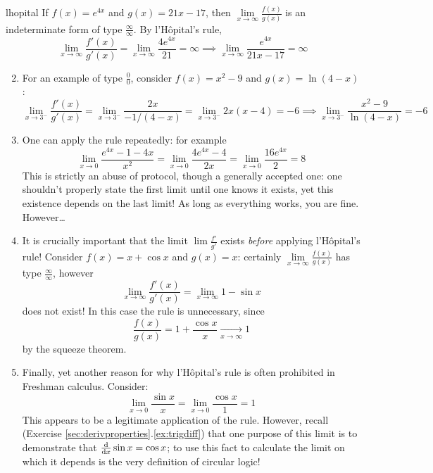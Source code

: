 \begin{examples}{}{lhopital}
	\exstart If $f(x)=e^{4x}$ and $g(x)=21x-17$, then $\lim\limits_{x\to\infty}\frac{f(x)}{g(x)}$ is an indeterminate form of type $\frac\infty\infty$. By l'Hôpital's rule,
	\[
	 	\lim_{x\to\infty}\frac{f'(x)}{g'(x)}
	 	=\lim_{x\to\infty}\frac{4e^{4x}}{21}=\infty
	 	\implies \lim_{x\to\infty}\frac{e^{4x}}{21x-17}=\infty
	\]
	
	\begin{enumerate}\setcounter{enumi}{1}
	  \item For an example of type $\frac 00$, consider $f(x)=x^2-9$ and $g(x)=\ln(4-x)$:
	  \[
		  \lim_{x\to 3^-}\frac{f'(x)}{g'(x)} 
		  =\lim_{x\to 3^-}\frac{2x}{-1/(4-x)} 
		  =\lim_{x\to 3^-}2x(x-4)=-6
		  \implies \lim_{x\to 3^-}\frac{x^2-9}{\ln(4-x)}=-6
	  \]
	  
	  \item One can apply the rule repeatedly: for example
	  \[
	  	\lim_{x\to 0}\frac{e^{4x}-1-4x}{x^2}
	  	=\lim_{x\to 0}\frac{4e^{4x}-4}{2x} 
	  	=\lim_{x\to 0}\frac{16e^{4x}}{2}=8
	  \]
	  This is strictly an abuse of protocol, though a generally accepted one: one shouldn't properly state the first limit until one knows it exists, yet this existence depends on the last limit! As long as everything works, you are fine. However\ldots
	  
	  \item\label{ex:lhopitalproblem1} It is crucially important that the limit $\lim\frac{f'}{g'}$ exists \emph{before} applying l'Hôpital's rule! Consider $f(x)=x+\cos x$ and $g(x)=x$: certainly $\lim\limits_{x\to\infty}\frac{f(x)}{g(x)}$ has type $\frac\infty\infty$, however
	  \[
	  	\lim\limits_{x\to\infty}\frac{f'(x)}{g'(x)}
	  	=\lim\limits_{x\to\infty}1-\sin x
	  \]
	  does not exist! In this case the rule is unnecessary, since
	  \[
	  	\frac{f(x)}{g(x)}
	  	=1+\frac{\cos x}x\xrightarrow[x\to\infty]{} 1
	  \]
	  by the squeeze theorem.
	  
	 	\item Finally, yet another reason for why l'Hôpital's rule is often prohibited in Freshman calculus. Consider:
	 	\[
	 		\lim_{x\to 0}\frac{\sin x}x
	 		=\lim_{x\to 0}\frac{\cos x}{1}=1
	 	\]
	 	This appears to be a legitimate application of the rule. However, recall (Exercise \ref*{sec:derivproperties}.\ref{ex:trigdiff}) that one purpose of this limit is to demonstrate that $\frac{\mathrm{d} }{\mathrm{d} x}\sin x=\cos x$; to use this fact to calculate the limit on which it depends is the very definition of circular logic!
	\end{enumerate}
\end{examples}


